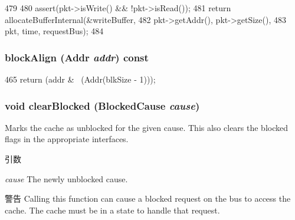 \begin{DoxyCode}
479     {
480         assert(pkt->isWrite() && !pkt->isRead());
481         return allocateBufferInternal(&writeBuffer,
482                                       pkt->getAddr(), pkt->getSize(),
483                                       pkt, time, requestBus);
484     }
\end{DoxyCode}
\hypertarget{classBaseCache_a676df8321350e810fc857d99cdcebc22}{
\subsubsection[{blockAlign}]{ blockAlign ({\bf Addr} {\em addr}) const}}
\label{classBaseCache_a676df8321350e810fc857d99cdcebc22}



\begin{DoxyCode}
465 { return (addr & ~(Addr(blkSize - 1))); }
\end{DoxyCode}
\hypertarget{classBaseCache_a78948a7bd2b849859bfc6fee2fc3d070}{
\subsubsection[{clearBlocked}]{\setlength{\rightskip}{0pt plus 5cm}void clearBlocked ({\bf BlockedCause} {\em cause})}}
\label{classBaseCache_a78948a7bd2b849859bfc6fee2fc3d070}
Marks the cache as unblocked for the given cause. This also clears the blocked flags in the appropriate interfaces. 
\begin{DoxyParams}{引数}
\item[{\em cause}]The newly unblocked cause. \end{DoxyParams}
\begin{DoxyWarning}{警告}
Calling this function can cause a blocked request on the bus to access the cache. The cache must be in a state to handle that request. 
\end{DoxyWarning}



